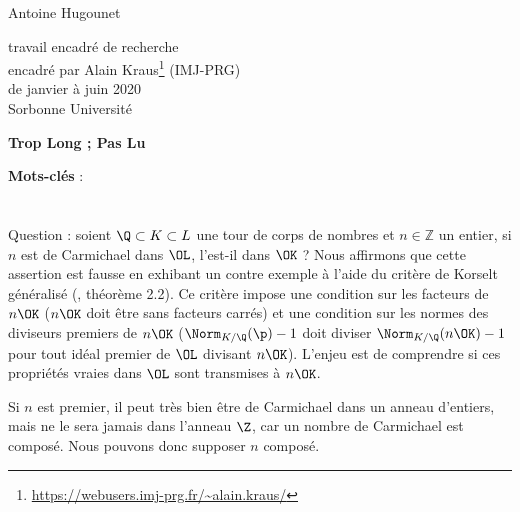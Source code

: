 \documentclass[a4paper, 12pt, oneside]{article}
\begin{document}
\begin{titlepage}
\begin{center}
	\large Antoine Hugounet \\

	\vspace{40px}
	\LARGE {}

	\vspace{40px}
	\large
	travail encadré de recherche \\
	encadré par Alain Kraus\footnote{\url{https://webusers.imj-prg.fr/~alain.kraus/}} (IMJ-PRG) \\
	de janvier à juin 2020 \\

	\vspace{20px}
	Sorbonne Université
\end{center}

\normalsize
\vspace{80px}
\begin{center} \textbf{Trop Long ; Pas Lu} \end{center}
\vspace{-1em}

\vfill
\begin{center}
	\normalsize \textbf{Mots-clés} : \textit{}
\end{center}
\end{titlepage}

\section{}

Question : soient $\Q \subset K \subset L$ une tour de corps de nombres et $n\in \mathbb{Z}$ un entier, si $n$ est de Carmichael dans $\OL$, l'est-il dans $\OK$ ? Nous affirmons que cette assertion est fausse en exhibant un contre exemple à l'aide du critère de Korselt généralisé (\cite{article}, théorème 2.2). Ce critère impose une condition sur les facteurs de $n\OK$ ($n\OK$ doit être sans facteurs carrés) et une condition sur les normes des diviseurs premiers de $n\OK$ ($\Norm_{K/\Q}(\p)-1$ doit diviser $\Norm_{K/\Q}(n\OK) - 1$ pour tout idéal premier de $\OL$ divisant $n\OK$). L'enjeu est de comprendre si ces propriétés vraies dans $\OL$ sont transmises à $n\OK$.

\begin{remarque}Si $n$ est premier, il peut très bien être de Carmichael dans un anneau d'entiers, mais ne le sera jamais dans l'anneau $\Z$, car un nombre de Carmichael est composé. Nous pouvons donc supposer $n$ composé. \end{remarque}
\end{document}

